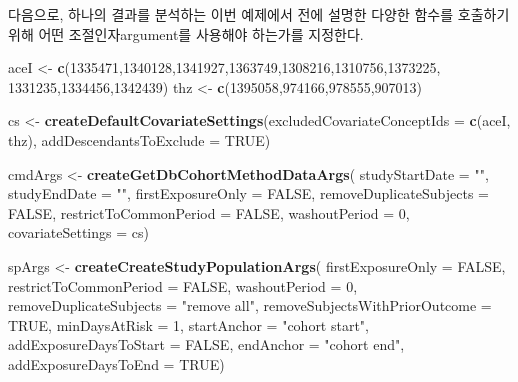 \documentclass[10.5pt]{book}
\newenvironment{Shaded}{\begin{snugshade}}{\end{snugshade}}
\newcommand{\KeywordTok}[1]{\textcolor[rgb]{0.13,0.29,0.53}{\textbf{#1}}}
\newcommand{\DataTypeTok}[1]{\textcolor[rgb]{0.13,0.29,0.53}{#1}}
\newcommand{\DecValTok}[1]{\textcolor[rgb]{0.00,0.00,0.81}{#1}}
\newcommand{\StringTok}[1]{\textcolor[rgb]{0.31,0.60,0.02}{#1}}
\newcommand{\OtherTok}[1]{\textcolor[rgb]{0.56,0.35,0.01}{#1}}
\newcommand{\NormalTok}[1]{#1}
\theoremstyle{definition}
\theoremstyle{definition}
\theoremstyle{definition}
\theoremstyle{remark}
\begin{document}
다음으로, 하나의 결과를 분석하는 이번 예제에서 전에 설명한 다양한 함수를
호출하기 위해 어떤 조절인자argument를 사용해야 하는가를 지정한다.

\begin{Shaded}
\begin{Highlighting}[]
\NormalTok{aceI <-}\StringTok{ }\KeywordTok{c}\NormalTok{(}\DecValTok{1335471}\NormalTok{,}\DecValTok{1340128}\NormalTok{,}\DecValTok{1341927}\NormalTok{,}\DecValTok{1363749}\NormalTok{,}\DecValTok{1308216}\NormalTok{,}\DecValTok{1310756}\NormalTok{,}\DecValTok{1373225}\NormalTok{,}
          \DecValTok{1331235}\NormalTok{,}\DecValTok{1334456}\NormalTok{,}\DecValTok{1342439}\NormalTok{)}
\NormalTok{thz <-}\StringTok{ }\KeywordTok{c}\NormalTok{(}\DecValTok{1395058}\NormalTok{,}\DecValTok{974166}\NormalTok{,}\DecValTok{978555}\NormalTok{,}\DecValTok{907013}\NormalTok{)}

\NormalTok{cs <-}\StringTok{ }\KeywordTok{createDefaultCovariateSettings}\NormalTok{(}\DataTypeTok{excludedCovariateConceptIds =} \KeywordTok{c}\NormalTok{(aceI,}
\NormalTok{                                                                     thz),}
                                     \DataTypeTok{addDescendantsToExclude =} \OtherTok{TRUE}\NormalTok{)}

\NormalTok{cmdArgs <-}\StringTok{ }\KeywordTok{createGetDbCohortMethodDataArgs}\NormalTok{(}
  \DataTypeTok{studyStartDate =} \StringTok{""}\NormalTok{,}
  \DataTypeTok{studyEndDate =} \StringTok{""}\NormalTok{,}
  \DataTypeTok{firstExposureOnly =} \OtherTok{FALSE}\NormalTok{,}
  \DataTypeTok{removeDuplicateSubjects =} \OtherTok{FALSE}\NormalTok{,}
  \DataTypeTok{restrictToCommonPeriod =} \OtherTok{FALSE}\NormalTok{,}
  \DataTypeTok{washoutPeriod =} \DecValTok{0}\NormalTok{,}
  \DataTypeTok{covariateSettings =}\NormalTok{ cs)}

\NormalTok{spArgs <-}\StringTok{ }\KeywordTok{createCreateStudyPopulationArgs}\NormalTok{(}
  \DataTypeTok{firstExposureOnly =} \OtherTok{FALSE}\NormalTok{,}
  \DataTypeTok{restrictToCommonPeriod =} \OtherTok{FALSE}\NormalTok{,}
  \DataTypeTok{washoutPeriod =} \DecValTok{0}\NormalTok{,}
  \DataTypeTok{removeDuplicateSubjects =} \StringTok{"remove all"}\NormalTok{,}
  \DataTypeTok{removeSubjectsWithPriorOutcome =} \OtherTok{TRUE}\NormalTok{,}
  \DataTypeTok{minDaysAtRisk =} \DecValTok{1}\NormalTok{,}
  \DataTypeTok{startAnchor =} \StringTok{"cohort start"}\NormalTok{,}
  \DataTypeTok{addExposureDaysToStart =} \OtherTok{FALSE}\NormalTok{,}
  \DataTypeTok{endAnchor =} \StringTok{"cohort end"}\NormalTok{,}
  \DataTypeTok{addExposureDaysToEnd =} \OtherTok{TRUE}\NormalTok{)}


\end{Highlighting}
\end{Shaded}
\end{document}

